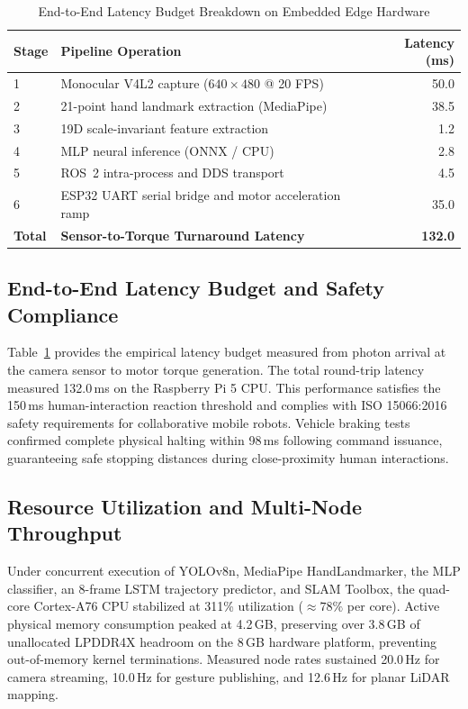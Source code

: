 \documentclass[conference]{IEEEtran}
\begin{document}
\begin{table}[t]
\centering
\caption{End-to-End Latency Budget Breakdown on Embedded Edge Hardware}
\label{tab:latency_budget}
\begin{tabular}{llr}
\toprule
\textbf{Stage} & \textbf{Pipeline Operation} & \textbf{Latency (ms)} \\
\midrule
1 & Monocular V4L2 capture ($640 \times 480$ @ 20 FPS) & 50.0 \\
2 & 21-point hand landmark extraction (MediaPipe) & 38.5 \\
3 & 19D scale-invariant feature extraction & 1.2 \\
4 & MLP neural inference (ONNX / CPU) & 2.8 \\
5 & ROS~2 intra-process and DDS transport & 4.5 \\
6 & ESP32 UART serial bridge and motor acceleration ramp & 35.0 \\
\midrule
\textbf{Total} & \textbf{Sensor-to-Torque Turnaround Latency} & \textbf{132.0} \\
\bottomrule
\end{tabular}
\end{table}

\subsection{End-to-End Latency Budget and Safety Compliance}
Table~\ref{tab:latency_budget} provides the empirical latency budget measured from photon arrival at the camera sensor to motor torque generation. The total round-trip latency measured 132.0\,ms on the Raspberry Pi 5 CPU. This performance satisfies the 150\,ms human-interaction reaction threshold and complies with ISO 15066:2016 safety requirements for collaborative mobile robots. Vehicle braking tests confirmed complete physical halting within 98\,ms following command issuance, guaranteeing safe stopping distances during close-proximity human interactions.

\subsection{Resource Utilization and Multi-Node Throughput}
Under concurrent execution of YOLOv8n, MediaPipe HandLandmarker, the MLP classifier, an 8-frame LSTM trajectory predictor, and SLAM Toolbox, the quad-core Cortex-A76 CPU stabilized at 311\% utilization ($\approx 78\%$ per core). Active physical memory consumption peaked at 4.2\,GB, preserving over 3.8\,GB of unallocated LPDDR4X headroom on the 8\,GB hardware platform, preventing out-of-memory kernel terminations. Measured node rates sustained 20.0\,Hz for camera streaming, 10.0\,Hz for gesture publishing, and 12.6\,Hz for planar LiDAR mapping.
\end{document}
